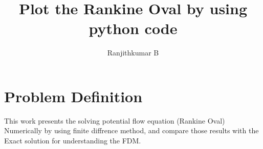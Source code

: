 \documentclass[conf]{new-aiaa}
\title{Plot the Rankine Oval by using python code}
\author{Ranjithkumar B}
\begin{document}
\maketitle

%


\section{Problem Definition}
\par This work presents the solving potential flow equation (Rankine Oval) Numerically by using finite diffrence method, and compare those results with the Exact solution for understanding the FDM. \\
\end{document}
